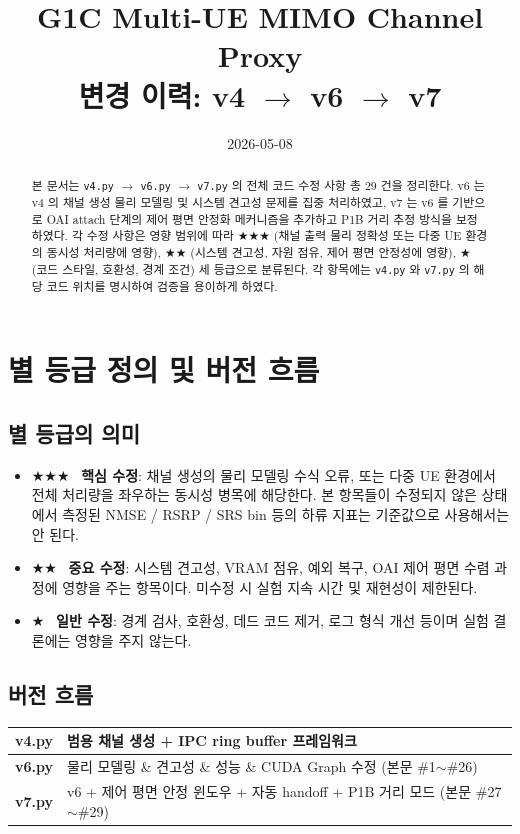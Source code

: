 \documentclass[11pt,a4paper]{article}
\title{\textbf{G1C Multi-UE MIMO Channel Proxy} \\[0.4em]
       \large 변경 이력: v4 $\to$ v6 $\to$ v7}
\author{}
\date{2026-05-08}
\newcommand{\sone}{\textcolor{starcolor}{$\bigstar$}}
\newcommand{\stwo}{\textcolor{starcolor}{$\bigstar\bigstar$}}
\newcommand{\sthree}{\textcolor{starcolor}{$\bigstar\bigstar\bigstar$}}
\newcommand{\vfour}{\texttt{v4.py}}
\newcommand{\vsix}{\texttt{v6.py}}
\newcommand{\vseven}{\texttt{v7.py}}
\begin{document}
\maketitle

\begin{abstract}
\noindent
본 문서는 \vfour{} $\to$ \vsix{} $\to$ \vseven{} 의 전체 코드 수정 사항
총 29 건을 정리한다. v6 는 v4 의 채널 생성 물리 모델링 및 시스템 견고성
문제를 집중 처리하였고, v7 는 v6 를 기반으로 OAI attach 단계의 제어 평면
안정화 메커니즘을 추가하고 P1B 거리 추정 방식을 보정하였다. 각 수정
사항은 영향 범위에 따라 \sthree{} (채널 출력 물리 정확성 또는 다중 UE
환경의 동시성 처리량에 영향), \stwo{} (시스템 견고성, 자원 점유,
제어 평면 안정성에 영향), \sone{} (코드 스타일, 호환성, 경계 조건)
세 등급으로 분류된다. 각 항목에는 \vfour{} 와 \vseven{} 의 해당
코드 위치를 명시하여 검증을 용이하게 하였다.
\end{abstract}

\tableofcontents
\vspace{1em}

\section{별 등급 정의 및 버전 흐름}
\label{sec:overview}

\subsection{별 등급의 의미}
\begin{itemize}
  \item \sthree{} \ \textbf{핵심 수정}: 채널 생성의 물리 모델링 수식 오류,
        또는 다중 UE 환경에서 전체 처리량을 좌우하는 동시성 병목에 해당한다.
        본 항목들이 수정되지 않은 상태에서 측정된 NMSE / RSRP / SRS bin 등의
        하류 지표는 기준값으로 사용해서는 안 된다.
  \item \stwo{} \ \textbf{중요 수정}: 시스템 견고성, VRAM 점유, 예외 복구,
        OAI 제어 평면 수렴 과정에 영향을 주는 항목이다. 미수정 시 실험
        지속 시간 및 재현성이 제한된다.
  \item \sone{} \ \textbf{일반 수정}: 경계 검사, 호환성, 데드 코드 제거,
        로그 형식 개선 등이며 실험 결론에는 영향을 주지 않는다.
\end{itemize}

\subsection{버전 흐름}
\begin{center}
\renewcommand{\arraystretch}{1.25}
\begin{tabular}{>{\bfseries}l p{12cm}}
\toprule
v4.py & 범용 채널 생성 + IPC ring buffer 프레임워크 \\
\midrule
v6.py & 물리 모델링 \& 견고성 \& 성능 \& CUDA Graph 수정 (본문 \#1$\sim$\#26) \\
\midrule
v7.py & v6 + 제어 평면 안정 윈도우 + 자동 handoff + P1B 거리 모드 (본문 \#27$\sim$\#29) \\
\bottomrule
\end{tabular}
\end{center}
\end{document}
